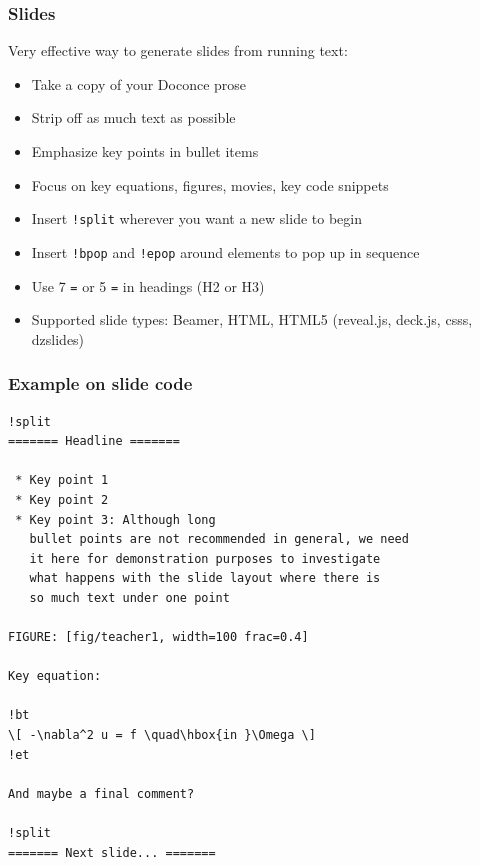 \documentclass{beamer}
\begin{document}
\begin{frame}
\frametitle{Slides}

Very effective way to generate slides from running text:

\begin{itemize}
 \item Take a copy of your Doconce prose

 \item Strip off as much text as possible

 \item Emphasize key points in bullet items

 \item Focus on key equations, figures, movies, key code snippets

 \item Insert \Verb~!split~ wherever you want a new slide to begin

 \item Insert \Verb~!bpop~ and \Verb~!epop~ around elements to pop up
   in sequence

 \item Use 7 \Verb!=! or 5 \Verb!=! in headings (H2 or H3)

 \item Supported slide types: Beamer, HTML,
   HTML5 (reveal.js, deck.js, csss, dzslides)
\end{itemize}

\noindent
\end{frame}

\begin{frame}
\frametitle{Example on slide code}

\begin{Verbatim}[numbers=none,fontsize=\fontsize{9pt}{9pt},baselinestretch=0.95]
!split
======= Headline =======

 * Key point 1
 * Key point 2
 * Key point 3: Although long
   bullet points are not recommended in general, we need
   it here for demonstration purposes to investigate
   what happens with the slide layout where there is
   so much text under one point

FIGURE: [fig/teacher1, width=100 frac=0.4]

Key equation:

!bt
\[ -\nabla^2 u = f \quad\hbox{in }\Omega \]
!et

And maybe a final comment?

!split
======= Next slide... =======
\end{Verbatim}
\end{frame}
\end{document}

